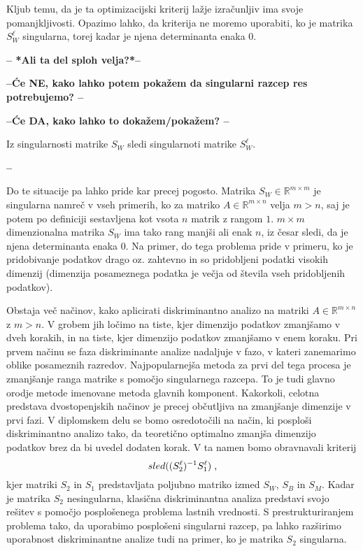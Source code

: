 \documentclass[mat1]{article}
\theoremstyle{definition}
\begin{document}
Kljub temu, da je ta optimizacijski kriterij lažje izračunljiv ima svoje pomanjkljivosti. Opazimo lahko, da kriterija ne moremo uporabiti, ko je matrika $S_W^\ell$ singularna, torej kadar je njena determinanta enaka 0. 

\textbf{-- *Ali ta del sploh velja?*--}

\textbf{--Će NE, kako lahko potem pokažem da singularni razcep res potrebujemo? --}

\textbf{--Će DA, kako lahko to dokažem/pokažem? --}

Iz singularnosti matrike $S_W$ sledi singularnoti matrike $S_W^\ell$.

\textbf{--}

Do te situacije pa lahko pride kar precej pogosto. Matrika $S_W \in  \mathbb{R}^{m \times m}$ je singularna namreč v vseh primerih, ko za matriko $A \in  \mathbb{R}^{m \times n}$ velja $m > n$, saj je potem po definiciji sestavljena kot vsota $n$ matrik z rangom $1$. $m \times m$ dimenzionalna matrika $S_W$ ima tako rang manjši ali enak $n$, iz česar sledi, da je njena determinanta enaka 0.
Na primer, do tega problema pride v primeru, ko je pridobivanje podatkov drago oz. zahtevno in so pridobljeni podatki visokih dimenzij (dimenzija posameznega podatka je večja od števila vseh pridobljenih podatkov).

Obstaja več načinov, kako aplicirati diskriminantno analizo na matriki $A \in \mathbb{R}^{m \times n}$ z $m > n$. V grobem jih ločimo na tiste, kjer dimenzijo podatkov zmanjšamo v dveh korakih, in na tiste, kjer dimenzijo podatkov zmanjšamo v enem koraku. Pri prvem načinu se faza diskriminante analize nadaljuje v fazo, v kateri zanemarimo oblike posameznih razredov. Najpopularnejša metoda za prvi del tega procesa je zmanjšanje ranga matrike s pomočjo singularnega razcepa. To je tudi glavno orodje metode imenovane metoda glavnih komponent. Kakorkoli, celotna predstava dvostopenjskih načinov je precej občutljiva na zmanjšanje dimenzije v prvi fazi. V diplomskem delu se bomo osredotočili na način, ki posploši diskriminantno analizo tako, da teoretično optimalno zmanjša dimenzijo podatkov brez da bi uvedel dodaten korak. V ta namen bomo obravnavali kriterij 
$$ sled((S_2^\ell)^{-1} S_1^\ell) \hspace{1mm} \text{,}
$$
kjer matriki $S_2$ in $S_1$ predstavljata poljubno matriko izmed $S_W$, $S_B$ in $S_M$.  Kadar je matrika $S_2$ nesingularna, klasična diskriminantna analiza predstavi svojo rešitev s pomočjo posplošenega problema lastnih vrednosti. S prestrukturiranjem problema tako, da uporabimo posplošeni singularni razcep, pa lahko razširimo uporabnost diskriminantne analize tudi na primer, ko je matrika $S_2$ singularna.
\end{document}
